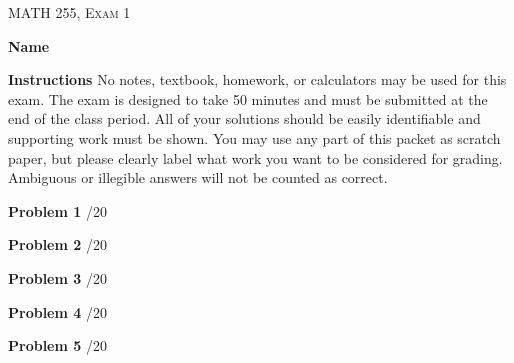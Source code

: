 \documentclass[12pt]{amsbook}
\begin{document}

\SetWatermarkText{
\begin{minipage}[c][8cm]{8cm}
\begin{center}
 
\end{center}
\end{minipage}
}



\begin{center}
   \textsc{\large MATH 255, Exam 1}\\
\end{center}
\vspace{1cm}

\textbf{Name} \; \underline{\hspace{5cm}}

\vspace{1cm}

\textbf{Instructions} \; No notes, textbook, homework, or calculators may be used for this exam. The exam is designed to take 50 minutes and must be submitted at the end of the class period. All of your solutions should be easily identifiable and supporting work must be shown. You may use any part of this packet as scratch paper, but please clearly label what work you want to be considered for grading. Ambiguous or illegible answers will not be counted as correct.

\vspace{1cm}

\textbf{Problem 1} \; \underline{\hspace{.75cm}}/20

\vspace{.25cm}

\textbf{Problem 2} \; \underline{\hspace{.75cm}}/20

\vspace{.25cm}

\textbf{Problem 3} \; \underline{\hspace{.75cm}}/20

\vspace{.25cm}

\textbf{Problem 4} \; \underline{\hspace{.75cm}}/20

\vspace{.25cm}

\textbf{Problem 5} \; \underline{\hspace{.75cm}}/20
\end{document}
